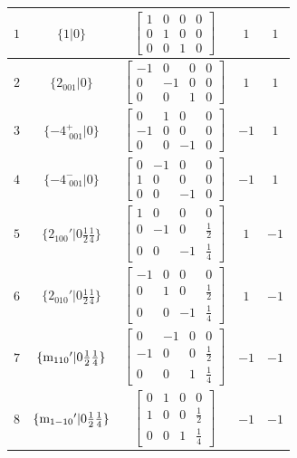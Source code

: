 \documentclass[fleqn,8pt]{jsarticle}
\begin{document}
\begin{longtable}{ccccc}
$ 1 $ & $ \{1|0\} $ & $ \begin{bmatrix} 1 & 0 & 0 & 0 \\ 0 & 1 & 0 & 0 \\ 0 & 0 & 1 & 0 \end{bmatrix} $ & $ 1 $ & $ 1 $ \\ \hline
$ 2 $ & $ \{2{}_{001}|0\} $ & $ \begin{bmatrix} -1 & 0 & 0 & 0 \\ 0 & -1 & 0 & 0 \\ 0 & 0 & 1 & 0 \end{bmatrix} $ & $ 1 $ & $ 1 $ \\ \hline
$ 3 $ & $ \{-4^{+}_{\,\,001}|0\} $ & $ \begin{bmatrix} 0 & 1 & 0 & 0 \\ -1 & 0 & 0 & 0 \\ 0 & 0 & -1 & 0 \end{bmatrix} $ & $ -1 $ & $ 1 $ \\ \hline
$ 4 $ & $ \{-4^{-}_{\,\,001}|0\} $ & $ \begin{bmatrix} 0 & -1 & 0 & 0 \\ 1 & 0 & 0 & 0 \\ 0 & 0 & -1 & 0 \end{bmatrix} $ & $ -1 $ & $ 1 $ \\ \hline
$ 5 $ & $ \{2{}_{100}{}'|0 \frac{1}{2} \frac{1}{4}\} $ & $ \begin{bmatrix} 1 & 0 & 0 & 0 \\ 0 & -1 & 0 & \frac{1}{2} \\ 0 & 0 & -1 & \frac{1}{4} \end{bmatrix} $ & $ 1 $ & $ -1 $ \\ \hline
$ 6 $ & $ \{2{}_{010}{}'|0 \frac{1}{2} \frac{1}{4}\} $ & $ \begin{bmatrix} -1 & 0 & 0 & 0 \\ 0 & 1 & 0 & \frac{1}{2} \\ 0 & 0 & -1 & \frac{1}{4} \end{bmatrix} $ & $ 1 $ & $ -1 $ \\ \hline
$ 7 $ & $ \{{\rm m}_{110}{}'|0 \frac{1}{2} \frac{1}{4}\} $ & $ \begin{bmatrix} 0 & -1 & 0 & 0 \\ -1 & 0 & 0 & \frac{1}{2} \\ 0 & 0 & 1 & \frac{1}{4} \end{bmatrix} $ & $ -1 $ & $ -1 $ \\ \hline
$ 8 $ & $ \{{\rm m}_{1-10}{}'|0 \frac{1}{2} \frac{1}{4}\} $ & $ \begin{bmatrix} 0 & 1 & 0 & 0 \\ 1 & 0 & 0 & \frac{1}{2} \\ 0 & 0 & 1 & \frac{1}{4} \end{bmatrix} $ & $ -1 $ & $ -1 $ \\ \hline

\end{longtable}
\end{document}
